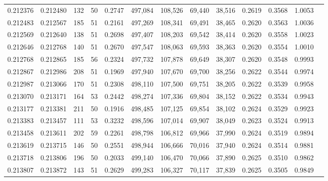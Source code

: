 \begin{tabular}{rrrrrrrrrrrrr}
0.212376 & 0.212480 &   132 &  50 &                                     0.2747 & 497,084 & 108,526 &  69,440 &  38,516 & 0.2619 & 0.3568 & 1.0053 \\
0.212483 & 0.212567 &   185 &  51 &                                     0.2161 & 497,269 & 108,341 &  69,491 &  38,465 & 0.2620 & 0.3563 & 1.0036 \\
0.212569 & 0.212640 &   138 &  51 &                                     0.2698 & 497,407 & 108,203 &  69,542 &  38,414 & 0.2620 & 0.3558 & 1.0023 \\
0.212646 & 0.212768 &   140 &  51 &                                     0.2670 & 497,547 & 108,063 &  69,593 &  38,363 & 0.2620 & 0.3554 & 1.0010 \\
0.212768 & 0.212865 &   185 &  56 &                                     0.2324 & 497,732 & 107,878 &  69,649 &  38,307 & 0.2620 & 0.3548 & 0.9993 \\
0.212867 & 0.212986 &   208 &  51 &                                     0.1969 & 497,940 & 107,670 &  69,700 &  38,256 & 0.2622 & 0.3544 & 0.9974 \\
0.212987 & 0.213066 &   170 &  51 &                                     0.2308 & 498,110 & 107,500 &  69,751 &  38,205 & 0.2622 & 0.3539 & 0.9958 \\
0.213070 & 0.213171 &   164 &  53 &                                     0.2442 & 498,274 & 107,336 &  69,804 &  38,152 & 0.2622 & 0.3534 & 0.9943 \\
0.213177 & 0.213381 &   211 &  50 &                                     0.1916 & 498,485 & 107,125 &  69,854 &  38,102 & 0.2624 & 0.3529 & 0.9923 \\
0.213383 & 0.213457 &   111 &  53 &                                     0.3232 & 498,596 & 107,014 &  69,907 &  38,049 & 0.2623 & 0.3524 & 0.9913 \\
0.213458 & 0.213611 &   202 &  59 &                                     0.2261 & 498,798 & 106,812 &  69,966 &  37,990 & 0.2624 & 0.3519 & 0.9894 \\
0.213619 & 0.213715 &   146 &  50 &                                     0.2551 & 498,944 & 106,666 &  70,016 &  37,940 & 0.2624 & 0.3514 & 0.9881 \\
0.213718 & 0.213806 &   196 &  50 &                                     0.2033 & 499,140 & 106,470 &  70,066 &  37,890 & 0.2625 & 0.3510 & 0.9862 \\
0.213807 & 0.213872 &   143 &  51 &                                     0.2629 & 499,283 & 106,327 &  70,117 &  37,839 & 0.2625 & 0.3505 & 0.9849 \\

\end{tabular}
